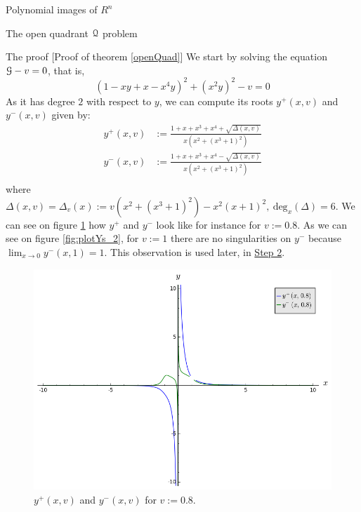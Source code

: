 \documentclass[11pt, a4paper, english, twoside, notitlepage, openright]{report}
\begin{document}
\begin{chapter}{Polynomial images of $R^n$}
\begin{section}{The open quadrant $\mathcal{Q}$ problem}
\begin{subsection}{The proof} [Proof of theorem \ref{openQuad}]
We start by solving the equation $\mathcal{G}-v=0$, that is, 
$$
(1-xy+x-x^4y)^2+(x^2y)^2-v=0
$$ 
As it has degree $2$ with respect to $y$, we can compute its roots $y^+(x,v)$ and $y^-(x,v)$ given by:
\begin{equation*}
\begin{aligned}
y^+(x,v)&:=\frac{1+x+x^3+x^4+\sqrt{\Delta(x,v)}}{x(x^2+(x^3+1)^2)}\\
y^-(x,v)&:=\frac{1+x+x^3+x^4-\sqrt{\Delta(x,v)}}{x(x^2+(x^3+1)^2)}\\
\end{aligned}
\end{equation*}
where $\Delta(x,v)=\Delta_v(x):=v(x^2+(x^3+1)^2)-x^2(x+1)^2,\ \text{deg}_x(\Delta)=6$. We can see on figure \ref{fig:plotYs_1} how $y^+$ and $y^-$ look like for instance for $v:=0.8$. As we can see on figure \ref{fig:plotYs_2}, for $v:=1$ there are no singularities on $y^-$ because $\lim_{x\rightarrow0}y^-(x,1)=1$. This observation is used later, in \hyperref[step2]{Step 2}.
\begin{figure}[h]
\centering
\includegraphics[width=1\textwidth]{plots/ch1_06_sols.png}
\caption{$y^+(x,v)$ and $y^-(x,v)$ for $v:= 0.8$.\label{fig:plotYs_1}}
\end{figure}
\begin{figure}[h]
\centering

\end{figure}
\end{subsection}
\end{section}
\end{chapter}
\end{document}
